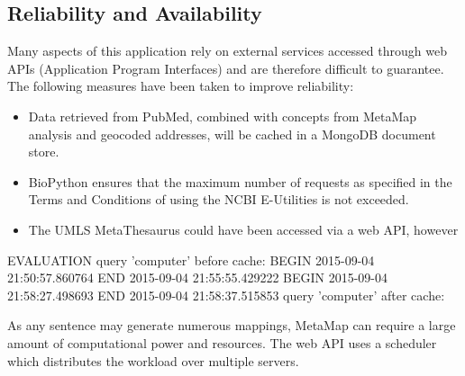 \subsection{Reliability and Availability}
Many aspects of this application rely on external services accessed through web APIs (Application Program Interfaces) and are therefore difficult to guarantee. The following measures have been taken to improve reliability:
\begin{itemize}
\item Data retrieved from PubMed, combined with concepts from MetaMap analysis and geocoded addresses, will be cached in a MongoDB document store.
\item BioPython ensures that the maximum number of requests as specified in the Terms and Conditions of using the NCBI E-Utilities\cite{} is not exceeded.
\item The UMLS MetaThesaurus could have been accessed via a web API, however 
\end{itemize}


EVALUATION
query 'computer' before cache: 
BEGIN 2015-09-04 21:50:57.860764
END 2015-09-04 21:55:55.429222
BEGIN 2015-09-04 21:58:27.498693
END 2015-09-04 21:58:37.515853
query 'computer' after cache: 

As any sentence may generate numerous mappings, MetaMap can require a large amount of computational power and resources\cite{metamap2010}. 
The web API uses a scheduler which distributes the workload over multiple servers. \cite{metamap2010}
